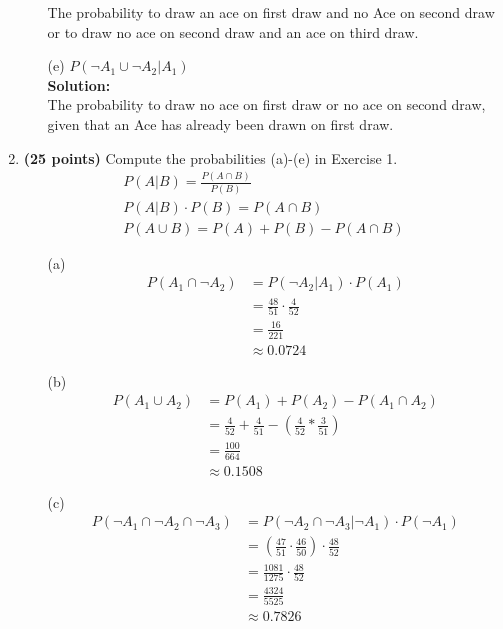 \documentclass[a4paper]{article}
\begin{document}
\begin{enumerate}
\begin{enumerate}
The probability to draw an ace on first draw and no Ace on second draw or to draw no ace on second draw and an ace on third draw.\\

	
	
	
	
	\item[(e)] $P(\neg A_1 \cup \neg A_2 | A_1)$\\
	\textbf{Solution:}\\
	
The probability to draw no ace on first draw or no ace on second draw, given that an Ace has already been drawn on first draw.\\	
	
	
	
\end{enumerate}


\item \textbf{(25 points)} Compute the probabilities (a)-(e) in Exercise 1.\\

\begin{align*}
P(A|B) = \frac{P(A \cap B)}{P(B)}\\
P(A|B) \cdot P(B) = P(A \cap B)\\
P(A \cup B) = P(A) + P(B) - P(A \cap B)
\end{align*}


\begin{enumerate}
	\item[(a)] 
	\begin{align*}
P(A_1 \cap \neg A_2) &= P(\neg A_2| A_1) \cdot P(A_1)\\
&= \frac{48}{51} \cdot \frac{4}{52}\\
&= \frac{16}{221}\\
&\approx 0.0724
\end{align*}		
	

	\item[(b)] 
\begin{align*}
P(A_1 \cup A_2) &= P(A_1) + P(A_2) - P(A_1 \cap A_2)\\
&= \frac{4}{52} + \frac{4}{51} - (\frac{4}{52} * \frac{3}{51})\\
&= \frac{100}{664}\\
&\approx 0.1508
\end{align*}	



	
	\item[(c)]
\begin{align*}
P(\neg A_1 \cap \neg A_2 \cap \neg A_3) &= P(\neg A_2 \cap \neg A_3| \neg A_1) \cdot P(\neg A_1)\\
&= (\frac{47}{51} \cdot \frac{46}{50})\cdot \frac{48}{52}\\
&= \frac{1081}{1275} \cdot \frac{48}{52}\\
&= \frac{4324}{5525}\\
&\approx 0.7826
\end{align*}	


\end{enumerate}
\end{enumerate}
\end{document}
